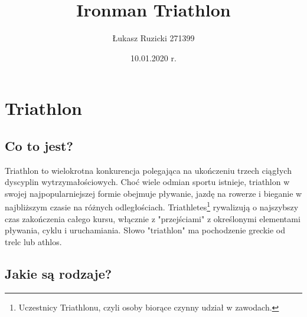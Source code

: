 \documentclass[12pt]{article}
\title{Ironman Triathlon}
\author{Łukasz Ruzicki 271399}
\date{10.01.2020 r.}
\begin{document}
\maketitle
\newpage

\tableofcontents

\newpage


\section{Triathlon}
\subsection{Co to jest?}
Triathlon to wielokrotna konkurencja polegająca na ukończeniu trzech ciągłych dyscyplin wytrzymałościowych. Choć wiele odmian sportu istnieje, triathlon w swojej najpopularniejszej formie obejmuje pływanie, jazdę na rowerze i bieganie w najbliższym czasie na różnych odległościach. Triathletes\footnote{Uczestnicy Triathlonu, czyli osoby biorące czynny udział w zawodach.} rywalizują o najszybszy czas zakończenia całego kursu, włącznie z "przejściami" z określonymi elementami pływania, cyklu i uruchamiania. Słowo "triathlon" ma pochodzenie greckie od trelc lub athlos.
\subsection{Jakie są rodzaje?}
\end{document}
